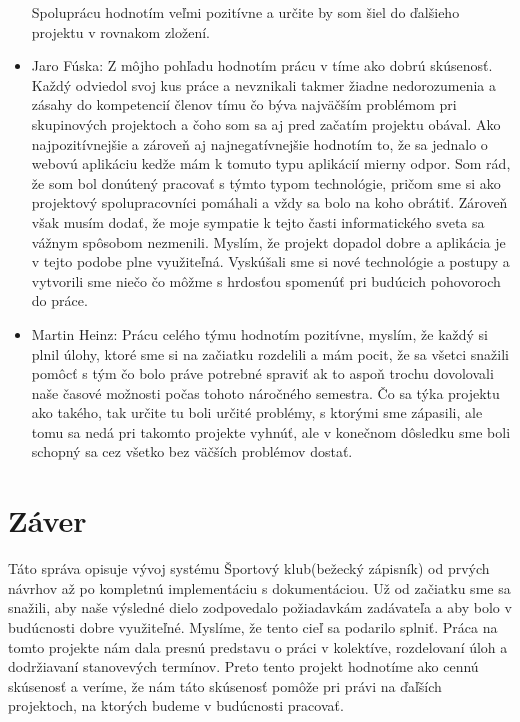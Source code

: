 \documentclass[12pt,a4paper]{report}
\theoremstyle{definition}
\theoremstyle{remark}
\begin{document}
\begin{itemize}
Spoluprácu hodnotím veľmi pozitívne a určite by som šiel do ďalšieho projektu v rovnakom zložení.
\item Jaro Fúska: Z môjho pohľadu hodnotím prácu v tíme ako dobrú skúsenosť. Každý odviedol svoj kus práce a nevznikali takmer žiadne nedorozumenia a zásahy do kompetencií členov tímu čo býva najväčším problémom pri skupinových projektoch a čoho som sa aj pred začatím projektu obával. Ako najpozitívnejšie a  zároveň aj najnegatívnejšie hodnotím to, že sa jednalo o webovú aplikáciu kedže mám k tomuto typu aplikácií mierny odpor. Som rád, že som bol donútený pracovať s týmto typom technológie, pričom sme si ako projektový spolupracovníci pomáhali a vždy sa bolo na koho obrátiť. Zároveň však musím dodať, že moje sympatie k tejto časti informatického sveta sa vážnym spôsobom nezmenili. Myslím, že projekt dopadol dobre a aplikácia je v tejto podobe plne využiteľná. Vyskúšali sme si nové technológie a postupy a vytvorili sme niečo čo môžme s hrdosťou spomenúť pri budúcich pohovoroch do práce.


\item Martin Heinz: Prácu celého týmu hodnotím pozitívne, myslím, že každý si plnil úlohy, ktoré sme si na začiatku rozdelili a mám pocit, že sa všetci snažili pomôcť s tým čo bolo práve potrebné spraviť ak to aspoň trochu dovolovali naše časové možnosti počas tohoto náročného semestra.
Čo sa týka projektu ako takého, tak určite tu boli určité problémy, s ktorými sme zápasili, ale tomu sa nedá pri takomto projekte vyhnúť, ale v konečnom dôsledku sme boli schopný sa cez všetko bez väčších problémov dostať.

\end{itemize}

\section{Záver}
Táto správa opisuje vývoj systému Športový klub(bežecký zápisník) od prvých návrhov až po
kompletnú implementáciu s dokumentáciou. Už od začiatku sme sa snažili, aby naše výsledné
dielo zodpovedalo požiadavkám zadávateľa a aby bolo v budúcnosti dobre využiteľné.
Myslíme, že tento cieľ sa podarilo splniť. Práca na tomto projekte nám dala presnú predstavu
o práci v kolektíve, rozdelovaní úloh a dodržiavaní stanovevých termínov. Preto tento projekt
hodnotíme ako cennú skúsenosť a veríme, že nám táto skúsenosť pomôže pri právi na ďaľších projektoch, na ktorých budeme v budúcnosti pracovať.
\end{document}
